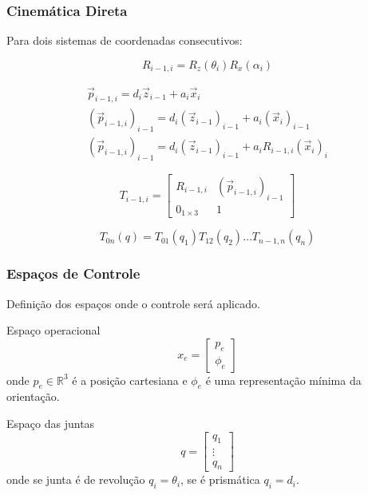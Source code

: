 \documentclass{beamer}
\newcommand\m[1]{\begin{bmatrix}#1\end{bmatrix}}
\begin{document}
\begin{frame}
\frametitle{Cinemática Direta}

Para dois sistemas de coordenadas consecutivos:

\begin{equation}
{R}_{i-1,i} = {R}_z(\theta_i){R}_x(\alpha_i)
\end{equation}

\begin{gather}
{\vec{p}}_{i-1,i} = d_i {\vec{z}}_{i-1} + a_i {\vec{x}}_i \\
({\vec{p}}_{i-1,i})_{i-1} = d_i ({\vec{z}}_{i-1})_{i-1} + a_i ({\vec{x}}_i)_{i-1} \\
({\vec{p}}_{i-1,i})_{i-1} = d_i ({\vec{z}}_{i-1})_{i-1} + a_i {R}_{i-1,i}({\vec{x}}_i)_{i} 
\end{gather}

\begin{equation}
T_{i-1,i} = \m{
    R_{i-1,i}       &  ({\vec{p}}_{i-1,i})_{i-1} \\
    0_{1 \times 3}  &                             1
}
\end{equation}

\begin{equation} \label{eq:cinedireta}
{T}_{0n}({q}) = {T}_{01}(q_1) {T}_{12}(q_{2}) {\dots} {T}_{n-1,n}(q_n)
\end{equation}

\end{frame}

\begin{frame}
\frametitle{Espaços de Controle}
Definição dos espaços onde o controle será aplicado.

\begin{block}{Espaço operacional}
\begin{equation} \label{eq:op_space}
{x}_e = \m{ {p}_e \\ {\phi}_e}
\end{equation}
onde ${p}_e \in \mathbb{R}^3$ é a posição cartesiana e ${\phi}_e$ é uma representação mínima da orientação.
\end{block}

\begin{block}{Espaço das juntas}
\begin{equation} \label{eq:joint_space}
{q} = \m{q_1 \\ \vdots \\ q_n}
\end{equation} 
onde se junta é de revolução $q_i = \theta_i$, se é prismática $q_i = d_i$.
\end{block}
\end{frame}
\end{document}
